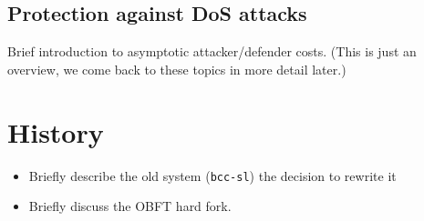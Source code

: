 \duncan

\subsection{Protection against DoS attacks}

Brief introduction to asymptotic attacker/defender costs. (This is just an
overview, we come back to these topics in more detail later.)

\duncan

\section{History}
\label{overview:history} %

\duncan

\begin{itemize}
\item Briefly describe the old system (\lstinline!bcc-sl!) the decision
to rewrite it
\item Briefly discuss the OBFT hard fork.
\end{itemize}
